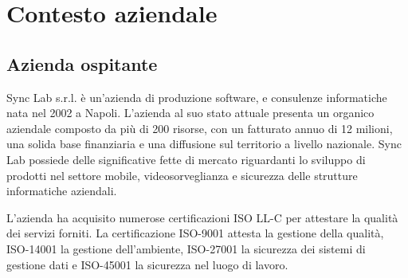 \chapter{Contesto aziendale}

\section{Azienda ospitante}
Sync Lab s.r.l. è un'azienda di produzione software,  e consulenze informatiche nata nel 2002 a Napoli.
L'azienda al suo stato attuale presenta un organico aziendale composto da più di 200 risorse, con un fatturato annuo di 12 milioni, una solida base finanziaria e una diffusione sul territorio a livello nazionale.
Sync Lab possiede delle significative fette di mercato riguardanti lo sviluppo di prodotti nel settore mobile, videosorveglianza e sicurezza delle strutture informatiche aziendali.

L'azienda ha acquisito numerose certificazioni ISO LL-C per attestare la qualità dei servizi forniti.
La certificazione ISO-9001 attesta la gestione della qualità, ISO-14001 la gestione dell'ambiente, ISO-27001 la sicurezza dei sistemi di gestione dati e ISO-45001 la sicurezza nel luogo di lavoro.

